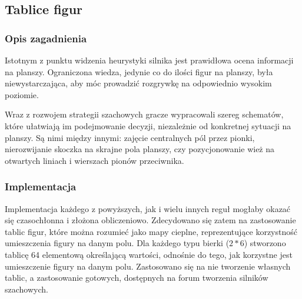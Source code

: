 \subsection{Tablice figur}
\label{subsec:tablice-figur}

\subsubsection{Opis zagadnienia}
Istotnym z punktu widzenia heurystyki silnika jest prawidłowa ocena informacji na planszy.
Ograniczona wiedza, jedynie co do ilości figur na planszy, była niewystarczająca, aby móc prowadzić rozgrywkę na odpowiednio wysokim poziomie.

Wraz z rozwojem strategii szachowych gracze wypracowali szereg schematów, które ułatwiają im podejmowanie decyzji, niezależnie od konkretnej sytuacji na planszy.
Są nimi między innymi: zajęcie centralnych pól przez pionki, nierozwijanie skoczka na skrajne pola planszy, czy pozycjonowanie wież na otwartych liniach i wierszach pionów przeciwnika.

\subsubsection{Implementacja}
Implementacja każdego z powyższych, jak i wielu innych reguł mogłaby okazać się czasochłonna i złożona obliczeniowo.
Zdecydowano się zatem na zastosowanie tablic figur, które można rozumieć jako mapy cieplne, reprezentujące korzystność umieszczenia figury na danym polu.
Dla każdego typu bierki ($2*6$) stworzono tablicę 64 elementową określającą wartości, odnośnie do tego, jak korzystne jest umieszczenie figury na danym polu.
Zastosowano się na nie tworzenie własnych tablic, a zastosowanie gotowych, dostępnych na forum tworzenia silników szachowych. \cite*{wiki-tablica-figur}


